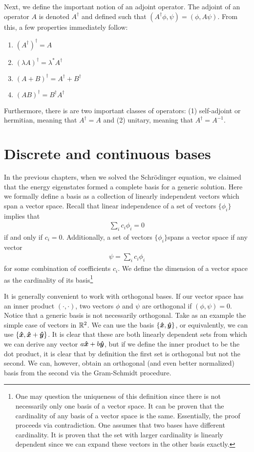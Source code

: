Next, we define the important notion of an adjoint operator.
The adjoint of an operator $A$ is denoted $A^{\dagger}$ and defined such that $(A^{\dagger} \phi,\psi) = (\phi,A\psi)$.
From this, a few properties immediately follow:
\begin{enumerate}
    \item $(A^{\dagger})^{\dagger} = A$
    \item $(\lambda A)^{\dagger} = \lambda^{*} A^{\dagger}$
    \item $(A + B)^{\dagger} = A^{\dagger} + B ^{\dagger}$
    \item $(AB)^{\dagger} = B^{\dagger} A ^{\dagger}$
\end{enumerate}
Furthermore, there is are two important classes of operators: (1) self-adjoint or hermitian, meaning that $A^{\dagger} = A$ and (2) unitary, meaning that $A^{\dagger} = A^{-1}$.


\section{Discrete and continuous bases}

In the previous chapters, when we solved the Schr\"{o}dinger equation, we claimed that the energy eigenstates formed a complete basis for a generic solution.
Here we formally define a basis as a collection of linearly independent vectors which span a vector space.
Recall that linear independence of a set of vectors $\{ \phi_{i} \}$ implies that 
\begin{eqnarray}
    \sum_{i} c_{i} \phi_{i} = 0
\end{eqnarray}
if and only if $c_{i} = 0$.
Additionally, a set of vectors $\{ \phi_{i} \}$spans a vector space if any vector 
\begin{eqnarray}
    \psi = \sum_{i} c_{i} \phi_{i}
\end{eqnarray}
for some combination of coefficients $c_{i}$.
We define the dimension of a vector space as the cardinality of its basis\footnote{One may question the uniqueness of this definition since there is not necessarily only one basis of a vector space. It can be proven that the cardinality of any basis of a vector space is the same. Essentially, the proof proceeds via contradiction. One assumes that two bases have different cardinality. It is proven that the set with larger cardinality is linearly dependent since we can expand these vectors in the other basis exactly.}

It is generally convenient to work with orthogonal bases.
If our vector space has an inner product $(\cdot,\cdot)$, two vectors $\phi$ and $\psi$ are orthogonal if $(\phi,\psi) = 0$.
Notice that a generic basis is not necessarily orthogonal.
Take as an example the simple case of vectors in $\mathbb{R}^2$.
We can use the basis $\{ \vu*{x},\vu*{y} \}$, or equivalently, we can use $\{ \vu*{x},\vu*{x} + \vu*{y} \}$.
It is clear that these are both linearly dependent sets from which we can derive any vector $a \vu*{x} + b \vu*{y}$, but if we define the inner product to be the dot product, it is clear that by definition the first set is orthogonal but not the second.
We can, however, obtain an orthogonal (and even better normalized) basis from the second via the Gram-Schmidt procedure.

